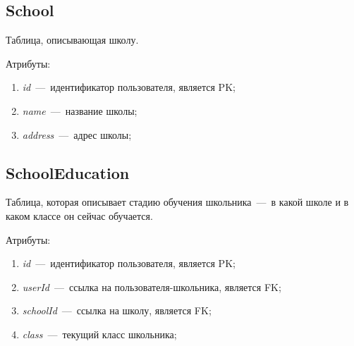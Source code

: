 \documentclass[14pt]{article}
\begin{document}
\subsection{School}

Таблица, описывающая школу.

Атрибуты:
\begin{enumerate}
	\item \emph{id}~---~идентификатор пользователя, является PK; 
	\item \emph{name}~---~название школы;
	\item \emph{address}~---~адрес школы;
\end{enumerate}

\subsection{SchoolEducation}

Таблица, которая описывает стадию обучения школьника~---~в какой школе и в каком классе он сейчас обучается.

Атрибуты:
\begin{enumerate}
	\item \emph{id}~---~идентификатор пользователя, является PK; 
	\item \emph{userId}~---~ссылка на пользователя-школьника, является FK;
	\item \emph{schoolId}~---~ссылка на школу, является FK;
	\item \emph{class}~---~текущий класс школьника;
\end{enumerate}
\end{document}
